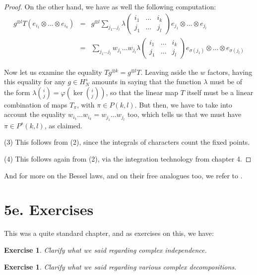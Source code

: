 \documentclass[12pt]{amsbook}
\newtheorem{exercise}[theorem]{Exercise}
\begin{document}
\begin{proof}
On the other hand, we have as well the following computation:
\begin{eqnarray*}
g^{\otimes l}T(e_{i_1}\otimes\ldots\otimes e_{i_k})
&=&g^{\otimes l}\sum_{j_1\ldots j_l}\lambda
\begin{pmatrix}i_1&\ldots& i_k\\ j_1&\ldots& j_l\end{pmatrix}e_{j_1}\otimes\ldots\otimes e_{j_l}\\
&=&\sum_{j_1\ldots j_l}w_{j_1}\ldots w_{j_l}\lambda
\begin{pmatrix}i_1&\ldots&i_k\\ j_1&\ldots&j_l\end{pmatrix}e_{\sigma(j_1)}\otimes\ldots\otimes e_{\sigma(j_l)}
\end{eqnarray*}

Now let us examine the equality $Tg^{\otimes k}=g^{\otimes l}T$. Leaving aside the $w$ factors, having this equality for any $g\in H_N^s$ amounts in saying that the function $\lambda$ must be of the form $\lambda\binom{i}{j}=\varphi(\ker\binom{i}{j})$, so that the linear map $T$ itself must be a linear combination of maps $T_\pi$, with $\pi\in P(k,l)$. But then, we have to take into account the equality $w_{i_1}\ldots w_{i_k}=w_{j_1}\ldots w_{j_l}$ too, which tells us that we must have $\pi\in P^s(k,l)$, as claimed.

\medskip

(3) This follows from (2), since the integrals of characters count the fixed points.

\medskip

(4) This follows again from (2), via the integration technology from chapter 4. 
\end{proof}

And for more on the Bessel laws, and on their free analogues too, we refer to \cite{bb+}.

\section*{5e. Exercises}

This was a quite standard chapter, and as exercises on this, we have:

\begin{exercise}
Clarify what we said regarding complex independence.
\end{exercise}

\begin{exercise}
Clarify what we said regarding various complex decompositions.
\end{exercise}
\end{document}
